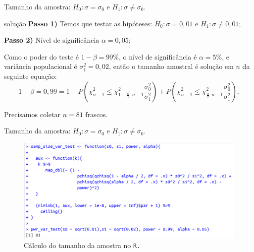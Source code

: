 \documentclass[8pt]{beamer}
\begin{document}
\begin{frame}{Tamanho da amostra: $H_0: \sigma = \sigma_0$ e $H_1: \sigma \neq \sigma_0$.}

\begin{block}{solução}
	\textbf{Passo 1)} Temos que testar as hipóteses: $H_0: \sigma = 0,01$ e $H_1: \sigma \neq 0,01$;
	
	\textbf{Passo 2)} Nível de significância $\alpha=0,05$;
	
	Como o poder do teste é $1-\beta=99\%$, o nível de significância é $\alpha=5\%$, e variância populacional é $\sigma_1^2=0,02$, então o tamanho amostral é solução em $n$ da seguinte equação:
	$$1- \beta = 0,99 = 1 - P\left( \chi_{n-1}^2 \leq \chi_{1-\frac{\alpha}{2};n-1}^2 \frac{\sigma_0^2}{\sigma_1^2} \right) + P \left( \chi_{n-1}^2 \leq \chi_{\frac{\alpha}{2};n-1}^2 \frac{\sigma_0^2}{\sigma_1^2} \right).$$
\end{block}

Precisamos coletar $n=81$ frascos.

\end{frame}


\begin{frame}{Tamanho da amostra: $H_0: \sigma = \sigma_0$ e $H_1: \sigma \neq \sigma_0$.}

\begin{figure}[htbp]
	\centering
	\includegraphics[width=1\linewidth]{figures/var-test-power-bilateral-R.png}
	\caption{Cálculo do tamanho da amostra no \texttt{R.}}
\end{figure}

\end{frame}
\end{document}

